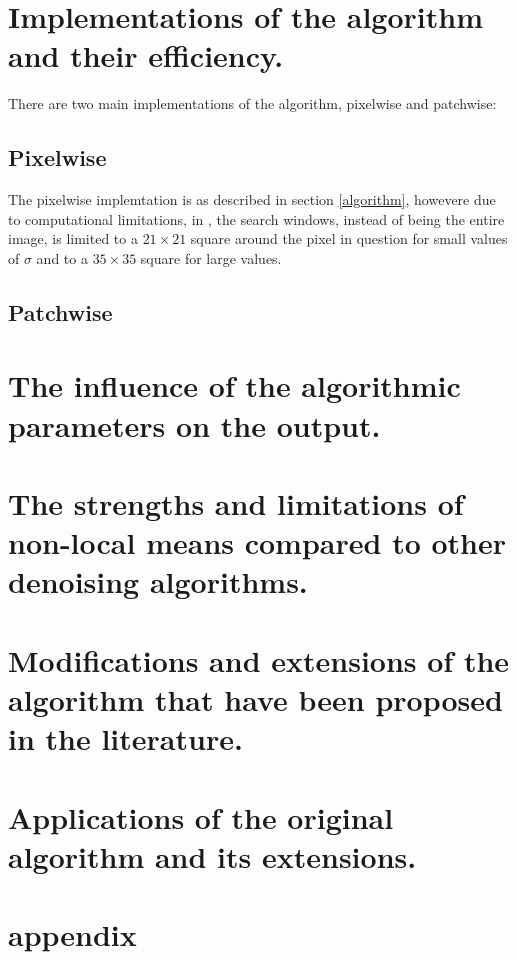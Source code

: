 \documentclass[11pt]{article}
\begin{document}
\section{Implementations of the algorithm and their efficiency.}

There are two main implementations of the algorithm, pixelwise and patchwise:

\subsection{Pixelwise}

The pixelwise implemtation is as described in section \ref{algorithm}, howevere due to computational limitations, in \cite{nlmd}, the search windows, instead of being the entire image, is limited to a $21\times 21$ square around the pixel in question for small values of $\sigma$ and to a $35 \times 35$ square for large values.

\subsection{Patchwise}



\section{The influence of the algorithmic parameters on the output.}



\section{The strengths and limitations of non-local means compared to other denoising algorithms. }




\section{Modifications and extensions of the algorithm that have been proposed in the literature. }



\section{Applications of the original algorithm and its extensions. }





\pagebreak
\section{appendix}
\end{document}
